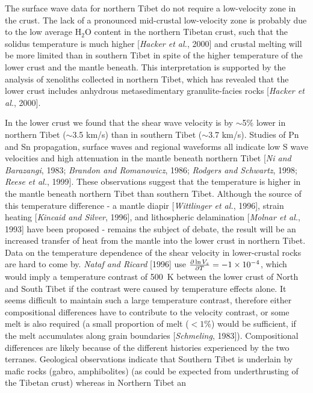 \documentclass[12pt]{article}
\newcommand{\de}[2]{ {{\partial #1}\over{\partial #2}} }
\begin{document}
The surface wave data for northern Tibet do not require a low-velocity zone in the crust.  The lack of a 
pronounced mid-crustal low-velocity zone is probably due to the low average H$_2$O content in the northern 
Tibetan crust, such that the solidus temperature is much higher [{\it Hacker et al.}, 2000] and crustal 
melting will be more limited than in southern Tibet in spite of the higher temperature of the lower crust 
and the mantle beneath.  This interpretation is supported by the analysis of xenoliths collected in 
northern Tibet, which has revealed that the lower crust includes anhydrous metasedimentary 
granulite-facies rocks [{\it Hacker et al.}, 2000]. 

In the lower crust we found that the shear wave velocity 
 is by $\sim$5\% lower in northern Tibet ($\sim$3.5 km/s) than in
southern Tibet ($\sim$3.7 km/s).  
 Studies of Pn and Sn propagation, surface waves and regional waveforms all 
indicate low S wave velocities and high attenuation in the mantle beneath northern Tibet [{\it Ni and 
Barazangi}, 1983; {\it Brandon and Romanowicz}, 1986; {\it Rodgers and Schwartz}, 1998; {\it Reese et al.}, 
1999].  These observations suggest that the temperature is higher in the mantle beneath northern Tibet than 
southern Tibet.  Although the source of this temperature difference - a mantle diapir [{\it Wittlinger et al.}, 
1996], strain heating [{\it Kincaid and Silver}, 1996], and lithospheric delamination [{\it Molnar et al.}, 
1993] have been proposed - remains the subject of debate, the result will be an increased transfer of heat from the mantle 
into the lower crust in northern Tibet. 
Data on the temperature dependence of the shear velocity in
lower-crustal
rocks are hard to come by. {\it Nataf and Ricard} [1996] use
$\de{\ln V_s}{T}=-1\times 10^{-4}$, which would imply a temperature
contrast of 500~K between the lower crust of North and South Tibet if
the contrast were caused by temperature effects alone.
It seems difficult to maintain such a large temperature contrast,
therefore either compositional differences have to contribute to the
velocity contrast,  or  some melt is also required (a small proportion of melt ($<1$\%)
would be sufficient, if the melt accumulates along grain boundaries
[{\it Schmeling}, 1983]).
Compositional differences are likely because 
of the different histories experienced by the two terranes.
Geological observations indicate that Southern Tibet is underlain by
mafic rocks (gabro, amphibolites) (as could be expected from
underthrusting of the Tibetan crust) whereas in Northern Tibet an
\end{document}
